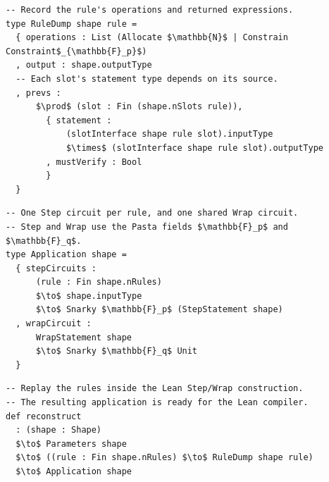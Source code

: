 \documentclass[11pt,a4paper]{article}
\newenvironment{schematicblock}
  {\par\noindent\begin{minipage}{\linewidth}}
  {\end{minipage}\par}
\theoremstyle{definition}
\theoremstyle{insetstatement}
\begin{document}
\begin{schematicblock}
\begin{lstlisting}[style=schematic]
-- Record the rule's operations and returned expressions.
type RuleDump shape rule =
  { operations : List (Allocate $\mathbb{N}$ | Constrain Constraint$_{\mathbb{F}_p}$)
  , output : shape.outputType
  -- Each slot's statement type depends on its source.
  , prevs :
      $\prod$ (slot : Fin (shape.nSlots rule)),
        { statement :
            (slotInterface shape rule slot).inputType
            $\times$ (slotInterface shape rule slot).outputType
        , mustVerify : Bool
        }
  }
\end{lstlisting}
\end{schematicblock}

\begin{schematicblock}
\begin{lstlisting}[style=schematic]
-- One Step circuit per rule, and one shared Wrap circuit.
-- Step and Wrap use the Pasta fields $\mathbb{F}_p$ and $\mathbb{F}_q$.
type Application shape =
  { stepCircuits :
      (rule : Fin shape.nRules)
      $\to$ shape.inputType
      $\to$ Snarky $\mathbb{F}_p$ (StepStatement shape)
  , wrapCircuit :
      WrapStatement shape
      $\to$ Snarky $\mathbb{F}_q$ Unit
  }
\end{lstlisting}
\end{schematicblock}

\begin{schematicblock}
\begin{lstlisting}[style=schematic]
-- Replay the rules inside the Lean Step/Wrap construction.
-- The resulting application is ready for the Lean compiler.
def reconstruct
  : (shape : Shape)
  $\to$ Parameters shape
  $\to$ ((rule : Fin shape.nRules) $\to$ RuleDump shape rule)
  $\to$ Application shape
\end{lstlisting}
\end{schematicblock}
\end{document}
